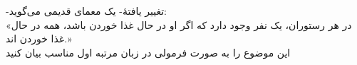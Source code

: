 -تغییر یافتهٔ- یک معمای قدیمی می‌گوید:\\
	«در هر رستوران، یک نفر وجود دارد که اگر او در حال غذا خوردن باشد، همه در حال غذا خوردن اند.»\\
این موضوع را به صورت فرمولی در زبان مرتبه اول مناسب بیان کنید
